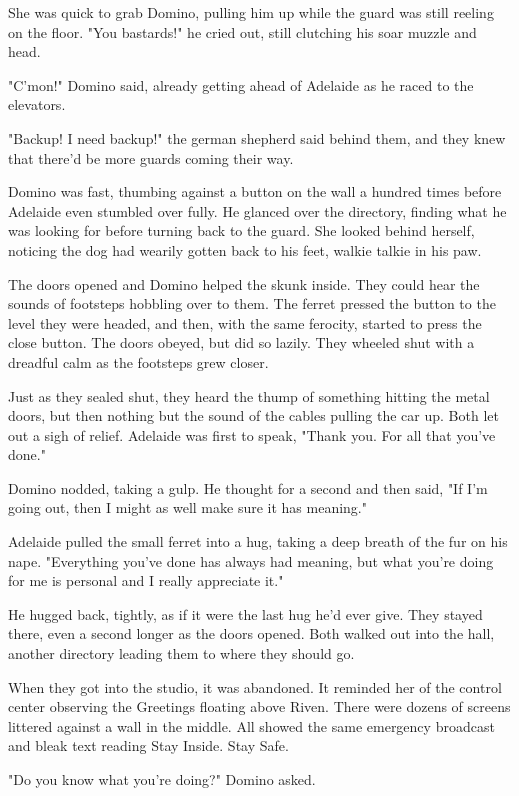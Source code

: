 She was quick to grab Domino, pulling him up while the guard was still reeling on the floor. "You bastards!" he cried out, still clutching his soar muzzle and head.

"C'mon!" Domino said, already getting ahead of Adelaide as he raced to the elevators.

"Backup! I need backup!" the german shepherd said behind them, and they knew that there'd be more guards coming their way.

Domino was fast, thumbing against a button on the wall a hundred times before Adelaide even stumbled over fully. He glanced over the directory, finding what he was looking for before turning back to the guard. She looked behind herself, noticing the dog had wearily gotten back to his feet, walkie talkie in his paw.

The doors opened and Domino helped the skunk inside. They could hear the sounds of footsteps hobbling over to them. The ferret pressed the button to the level they were headed, and then, with the same ferocity, started to press the close button. The doors obeyed, but did so lazily. They wheeled shut with a dreadful calm as the footsteps grew closer.

Just as they sealed shut, they heard the thump of something hitting the metal doors, but then nothing but the sound of the cables pulling the car up. Both let out a sigh of relief. Adelaide was first to speak, "Thank you. For all that you've done."

Domino nodded, taking a gulp. He thought for a second and then said, "If I'm going out, then I might as well make sure it has meaning."

Adelaide pulled the small ferret into a hug, taking a deep breath of the fur on his nape. "Everything you've done has always had meaning, but what you're doing for me is personal and I really appreciate it."

He hugged back, tightly, as if it were the last hug he'd ever give. They stayed there, even a second longer as the doors opened. Both walked out into the hall, another directory leading them to where they should go.

When they got into the studio, it was abandoned. It reminded her of the control center observing the Greetings floating above Riven. There were dozens of screens littered against a wall in the middle. All showed the same emergency broadcast and bleak text reading Stay Inside. Stay Safe.

"Do you know what you're doing?" Domino asked.

